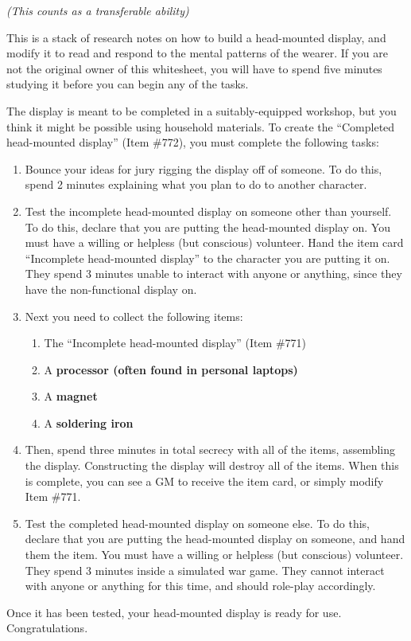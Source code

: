 \documentclass[white]{guildcamp1}
\begin{document}
\name{\wHeadMountedDisplay{}}

\emph{(This counts as a transferable ability)}

This is a stack of research notes on how to build a head-mounted display, and modify it to read and respond to the mental patterns of the wearer. If you are not the original owner of this whitesheet, you will have to spend five minutes studying it before you can begin any of the tasks.

The display is meant to be completed in a suitably-equipped workshop, but you think it might be possible using household materials. To create the ``Completed head-mounted display'' (Item \#772), you must complete the following tasks:

\begin{enumerate}
\item Bounce your ideas for jury rigging the display off of someone. To do this, spend 2 minutes explaining what you plan to do to another character.
\item Test the incomplete head-mounted display on someone other than yourself. To do this, declare that you are putting the head-mounted display on. You must have a willing or helpless (but conscious) volunteer. Hand the item card ``Incomplete head-mounted display'' to the character you are putting it on. They spend 3 minutes unable to interact with anyone or anything, since they have the non-functional display on.
\item  Next you need to collect the following items:
\begin{enumerate}
\item The  ``Incomplete head-mounted display'' (Item \#771)
\item A \bf{processor} (often found in personal laptops)
\item A \bf{magnet}
\item A \bf{soldering iron}
\end{enumerate}
\item Then, spend three minutes in total secrecy with all of the items, assembling the display. Constructing the display will destroy all of the items.  When this is complete, you can see a GM to receive the item card, or simply modify Item \#771.
\item Test the completed head-mounted display on someone else. To do this, declare that you are putting the head-mounted display on someone, and hand them the item. You must have a willing or helpless (but conscious) volunteer. They spend 3 minutes inside a simulated war game. They cannot interact with anyone or anything for this time, and should role-play accordingly.
\end{enumerate}

Once it has been tested, your head-mounted display is ready for use. Congratulations.
\end{document}
